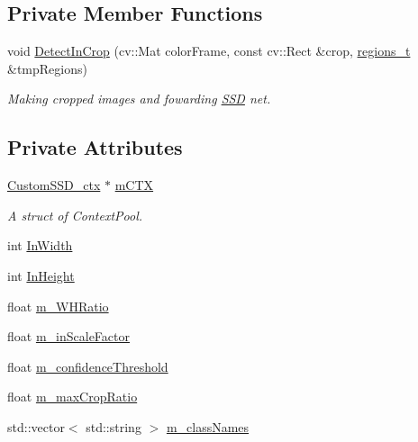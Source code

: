 \subsection*{Private Member Functions}
\begin{DoxyCompactItemize}
\item 
void \mbox{\hyperlink{class_s_s_d_custom_net_detector_a9e87debb1ee3634724914830d6c2079d}{Detect\+In\+Crop}} (cv\+::\+Mat color\+Frame, const cv\+::\+Rect \&crop, \mbox{\hyperlink{defines_8h_a01db0de56a20f4342820a093c5154536}{regions\+\_\+t}} \&tmp\+Regions)
\begin{DoxyCompactList}\small\item\em Making cropped images and fowarding \mbox{\hyperlink{class_s_s_d}{S\+SD}} net. \end{DoxyCompactList}\end{DoxyCompactItemize}
\subsection*{Private Attributes}
\begin{DoxyCompactItemize}
\item 
\mbox{\hyperlink{class_s_s_d_custom_net_detector_a979c7a383a8951d8d549bdf9e1045aae}{Custom\+S\+S\+D\+\_\+ctx}} $\ast$ \mbox{\hyperlink{class_s_s_d_custom_net_detector_ad0d9609d8e5b22e28cae854f0ac06058}{m\+C\+TX}}
\begin{DoxyCompactList}\small\item\em A struct of Context\+Pool. \end{DoxyCompactList}\item 
int \mbox{\hyperlink{class_s_s_d_custom_net_detector_aa40596238aee8ed737f132d5f842d65d}{In\+Width}}
\item 
int \mbox{\hyperlink{class_s_s_d_custom_net_detector_ad1f675644d34cba9e15b9ae47a51bd53}{In\+Height}}
\item 
float \mbox{\hyperlink{class_s_s_d_custom_net_detector_a31c168d1239dfd0c485afeea9a88a2e9}{m\+\_\+\+W\+H\+Ratio}}
\item 
float \mbox{\hyperlink{class_s_s_d_custom_net_detector_a259cb4e414d34637f97b08cd9eaf7067}{m\+\_\+in\+Scale\+Factor}}
\item 
float \mbox{\hyperlink{class_s_s_d_custom_net_detector_aa35b98cccf01cd5e9843a1e0c281a03d}{m\+\_\+confidence\+Threshold}}
\item 
float \mbox{\hyperlink{class_s_s_d_custom_net_detector_a41f65cc3327a94be76280cb2ad7f46f8}{m\+\_\+max\+Crop\+Ratio}}
\item 
std\+::vector$<$ std\+::string $>$ \mbox{\hyperlink{class_s_s_d_custom_net_detector_a888c6135df17be5eba5247851f6a5077}{m\+\_\+class\+Names}}
\end{DoxyCompactItemize}



